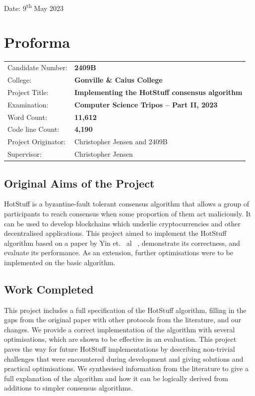\documentclass[12pt]{report}
\begin{document}
\noindent Date: 9\textsuperscript{th} May 2023

\chapter*{Proforma}

{\large
\begin{tabular}{ll}
Candidate Number:   & \bf 2409B \\
College:            & \bf Gonville \& Caius College                    \\
Project Title:      & \bf Implementing the HotStuff consensus algorithm \\
Examination:        & \bf Computer Science Tripos -- Part II, 2023  \\
Word Count:         & \bf 11,612\footnotemark[1] \\
Code line Count:    & \bf 4,190\footnotemark[2] \\
Project Originator: & Christopher Jensen and 2409B \\
Supervisor:         & Christopher Jensen \\ 
\end{tabular}
}

\section*{Original Aims of the Project}

HotStuff is a byzantine-fault tolerant consensus algorithm that allows a group of participants to reach consensus when some proportion of them act maliciously. It can be used to develop blockchains which underlie cryptocurrencies and other decentralised applications. This project aimed to implement the HotStuff algorithm based on a paper by Yin et. ~al~ \cite{yinHotStuffBFTConsensus2019}, demonstrate its correctness, and evaluate its performance. As an extension, further optimisations were to be implemented on the basic algorithm.


\section*{Work Completed}

This project includes a full specification of the HotStuff algorithm, filling in the gaps from the original paper with other protocols from the literature, and our changes. We provide a correct implementation of the algorithm with several optimisations, which are shown to be effective in an evaluation. This project paves the way for future HotStuff implementations by describing non-trivial challenges that were encountered during development and giving solutions and practical optimisations. We synthesised information from the literature to give a full explanation of the algorithm and how it can be logically derived from additions to simpler consensus algorithms.
\end{document}
